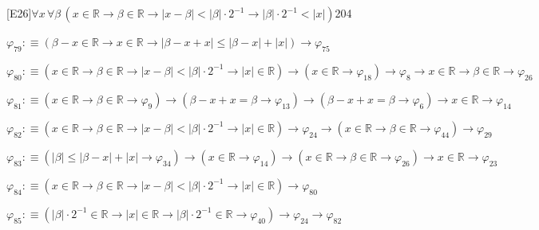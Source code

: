 \begin{fullproof}{[E26]}{$\forall x\,\forall \beta\,(x \in \mathbb{R} \to \beta \in \mathbb{R} \to \lvert x - \beta \rvert < \lvert \beta \rvert \cdot 2^{-1} \to \lvert \beta \rvert \cdot 2^{-1} < \lvert x \rvert)$}{204}
\begin{abbrevlist}
\item $\varphi_{79} :\equiv (\beta - x \in \mathbb{R} \to x \in \mathbb{R} \to \lvert \beta - x + x \rvert \leq \lvert \beta - x \rvert + \lvert x \rvert) \to \varphi_{75}$
\item $\varphi_{80} :\equiv (x \in \mathbb{R} \to \beta \in \mathbb{R} \to \lvert x - \beta \rvert < \lvert \beta \rvert \cdot 2^{-1} \to \lvert x \rvert \in \mathbb{R}) \to (x \in \mathbb{R} \to \varphi_{18}) \to \varphi_{8} \to x \in \mathbb{R} \to \beta \in \mathbb{R} \to \varphi_{26}$
\item $\varphi_{81} :\equiv (x \in \mathbb{R} \to \beta \in \mathbb{R} \to \varphi_{9}) \to (\beta - x + x = \beta \to \varphi_{13}) \to (\beta - x + x = \beta \to \varphi_{6}) \to x \in \mathbb{R} \to \varphi_{14}$
\item $\varphi_{82} :\equiv (x \in \mathbb{R} \to \beta \in \mathbb{R} \to \lvert x - \beta \rvert < \lvert \beta \rvert \cdot 2^{-1} \to \lvert x \rvert \in \mathbb{R}) \to \varphi_{24} \to (x \in \mathbb{R} \to \beta \in \mathbb{R} \to \varphi_{44}) \to \varphi_{29}$
\item $\varphi_{83} :\equiv (\lvert \beta \rvert \leq \lvert \beta - x \rvert + \lvert x \rvert \to \varphi_{34}) \to (x \in \mathbb{R} \to \varphi_{14}) \to (x \in \mathbb{R} \to \beta \in \mathbb{R} \to \varphi_{26}) \to x \in \mathbb{R} \to \varphi_{23}$
\item $\varphi_{84} :\equiv (x \in \mathbb{R} \to \beta \in \mathbb{R} \to \lvert x - \beta \rvert < \lvert \beta \rvert \cdot 2^{-1} \to \lvert x \rvert \in \mathbb{R}) \to \varphi_{80}$
\item $\varphi_{85} :\equiv (\lvert \beta \rvert \cdot 2^{-1} \in \mathbb{R} \to \lvert x \rvert \in \mathbb{R} \to \lvert \beta \rvert \cdot 2^{-1} \in \mathbb{R} \to \varphi_{40}) \to \varphi_{24} \to \varphi_{82}$
\end{abbrevlist}
\end{fullproof}

